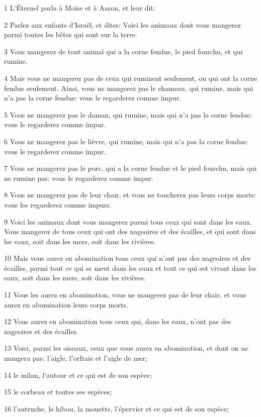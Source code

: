 \par 1 L'Éternel parla à Moïse et à Aaron, et leur dit:
\par 2 Parlez aux enfants d'Israël, et dites: Voici les animaux dont vous mangerez parmi toutes les bêtes qui sont sur la terre.
\par 3 Vous mangerez de tout animal qui a la corne fendue, le pied fourchu, et qui rumine.
\par 4 Mais vous ne mangerez pas de ceux qui ruminent seulement, ou qui ont la corne fendue seulement. Ainsi, vous ne mangerez pas le chameau, qui rumine, mais qui n'a pas la corne fendue: vous le regarderez comme impur.
\par 5 Vous ne mangerez pas le daman, qui rumine, mais qui n'a pas la corne fendue: vous le regarderez comme impur.
\par 6 Vous ne mangerez pas le lièvre, qui rumine, mais qui n'a pas la corne fendue: vous le regarderez comme impur.
\par 7 Vous ne mangerez pas le porc, qui a la corne fendue et le pied fourchu, mais qui ne rumine pas: vous le regarderez comme impur.
\par 8 Vous ne mangerez pas de leur chair, et vous ne toucherez pas leurs corps morts: vous les regarderez comme impurs.
\par 9 Voici les animaux dont vous mangerez parmi tous ceux qui sont dans les eaux. Vous mangerez de tous ceux qui ont des nageoires et des écailles, et qui sont dans les eaux, soit dans les mers, soit dans les rivières.
\par 10 Mais vous aurez en abomination tous ceux qui n'ont pas des nageoires et des écailles, parmi tout ce qui se meut dans les eaux et tout ce qui est vivant dans les eaux, soit dans les mers, soit dans les rivières.
\par 11 Vous les aurez en abomination, vous ne mangerez pas de leur chair, et vous aurez en abomination leurs corps morts.
\par 12 Vous aurez en abomination tous ceux qui, dans les eaux, n'ont pas des nageoires et des écailles.
\par 13 Voici, parmi les oiseaux, ceux que vous aurez en abomination, et dont on ne mangera pas: l'aigle, l'orfraie et l'aigle de mer;
\par 14 le milan, l'autour et ce qui est de son espèce;
\par 15 le corbeau et toutes ses espèces;
\par 16 l'autruche, le hibou, la mouette, l'épervier et ce qui est de son espèce;
